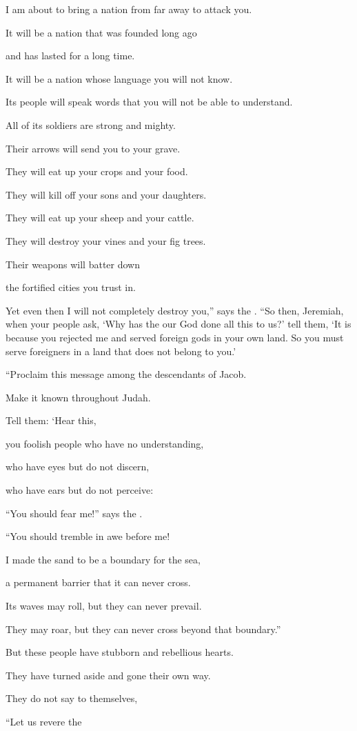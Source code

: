 {\par }{\Q I am about to bring
a nation
from far away
to attack you.
\par }{\Q It will be a nation
that was founded
long ago
\par }{\Q and has lasted for a long time.
\par }{\Q It will be a nation
whose language
you will not
know.
\par }{\Q Its people will speak
words that you will not
be able to understand.
\par }{\Q {}All
of its soldiers
are strong
and mighty.
\par }{\Q Their arrows
will send
you to your grave.
\par }{\Q {}They will eat up
your crops
and your food.
\par }{\Q They will kill off
your sons
and your daughters.
\par }{\Q They will eat up
your sheep
and your cattle.
\par }{\Q They will destroy
your vines
and your fig trees.
\par }{\Q Their weapons
will batter down
\par }{\Q the fortified
cities
you
trust in.
\par }{\PP {}Yet even
then I will not
completely
destroy you,” says
the {}.
“So
then, Jeremiah, when
your people ask, ‘Why
has the
{}
our God
done
all
this
to us?’ tell
them,
‘It is because you rejected
me and served
foreign
gods
in your own land.
So
you must serve
foreigners
in a land
that does not
belong to you.’
\par }{\Q {}“Proclaim
this
message among the descendants
of Jacob.
\par }{\Q Make it known
throughout Judah.
\par }{\Q {}Tell
them: ‘Hear
this,
\par }{\Q you foolish
people
who have no
understanding,
\par }{\Q who have eyes
but do not
discern,
\par }{\Q who have
ears
but do not
perceive:
\par }{\Q {}“You should fear
me!” says
the {}.
\par }{\Q “You should
tremble
in awe before
me!

\par }{\Q I made
the sand
to be a boundary
for the sea,
\par }{\Q a permanent
barrier
that it can never
cross.
\par }{\Q Its
waves
may roll,
but they
can never
prevail.
\par }{\Q They
may roar,
but they can
never
cross beyond that boundary.”
\par }{\Q {}But these
people
have stubborn
and rebellious
hearts.
\par }{\Q They have
turned aside
and gone
their own way.
\par }{\Q {}They do not
say
to themselves,
\par }{\Q “Let
us revere
the

}
